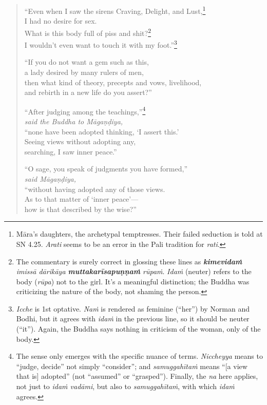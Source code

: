 \documentclass[12pt,openany]{book}%
\newcommand*{\scspeaker}[1]{\hspace{2em}\textit{#1}}
\begin{document}
\begin{verse}%
“Even when I saw the sirens Craving, Delight, and Lust,\footnote{\textsanskrit{Māra}’s daughters, the archetypal temptresses. Their failed seduction is told at SN 4.25. \textit{Arati} seems to be an error in the Pali tradition for \textit{rati}. } \\
I had no desire for sex. \\
What is this body full of piss and shit?\footnote{The commentary is surely correct in glossing these lines as \textit{\textbf{\textsanskrit{kimevidaṁ}} \textsanskrit{imissā} \textsanskrit{dārikāya} \textbf{\textsanskrit{muttakarīsapuṇṇaṁ}} \textsanskrit{rūpaṁ}}. \textit{\textsanskrit{Idaṁ}} (neuter) refers to the body (\textit{\textsanskrit{rūpa}}) not to the girl. It’s a meaningful distinction; the Buddha was criticizing the nature of the  body, not shaming the person. } \\
I wouldn’t even want to touch it with my foot.”\footnote{\textit{Icche} is 1st optative. \textit{\textsanskrit{Naṁ}} is rendered as feminine (“her”) by Norman and Bodhi, but it agrees with \textit{\textsanskrit{idaṁ}} in the previous line, so it should be neuter (“it”). Again, the Buddha says nothing in criticism of the woman, only of the body. } 

“If you do not want a gem such as this, \\
a lady desired by many rulers of men, \\
then what kind of theory, precepts and vows, livelihood, \\
and rebirth in a new life do you assert?” 

“After judging among the teachings,”\footnote{The sense only emerges with the specific nuance of terms. \textit{Niccheyya} means to “judge, decide” not simply “consider”; and \textit{\textsanskrit{samuggahītaṁ}} means “[a view that is] adopted” (not “assumed” or “grasped”). Finally, the \textit{na} here applies, not just to \textit{\textsanskrit{idaṁ} \textsanskrit{vadāmi}}, but also to \textit{\textsanskrit{samuggahītaṁ}}, with which \textit{\textsanskrit{idaṁ}} agrees. } \\
\scspeaker{said the Buddha to \textsanskrit{Māgaṇḍiya}, }\\
“none have been adopted thinking, ‘I assert this.’ \\
Seeing views without adopting any, \\
searching, I saw inner peace.” 

“O sage, you speak of judgments you have formed,” \\
\scspeaker{said \textsanskrit{Māgaṇḍiya}, }\\
“without having adopted any of those views. \\
As to that matter of ‘inner peace’—\\
how is that described by the wise?” 


\end{verse}
\end{document}
